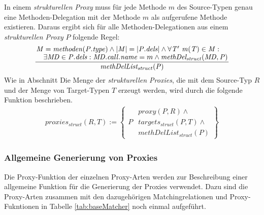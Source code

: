 In einem \emph{strukturellen Proxy} muss für jede Methode $m$ des Source-Typen genau eine Methoden-Delegation mit der Methode $m$ als aufgerufene Methode existieren. Daraus ergibt sich für alle Methoden-Delegationen aus einem \emph{strukturellen Proxy} $P$ folgende Regel:
\begin{gather*}
\frac{\splitfrac{\mathit{M} = \mathit{methoden(P.type)} \wedge |\mathit{M}| = |\mathit{P.dels}| \wedge \forall \mathit{T' \text{ }m(T)} \in \mathit{M}:}{\exists \mathit{MD} \in \mathit{P.dels}:\mathit{MD.call.name} = m \wedge \mathit{methDel_{struct}(MD,P)}
 }
}
{\mathit{methDelList_{struct}(P)}}
\end{gather*}
Wie in Abschnitt 
Die Menge der \emph{strukturellen Proxies}, die mit dem Source-Typ $R$ und der Menge von Target-Typen $T$ erzeugt werden, wird durch die folgende Funktion beschrieben.
\begin{gather*}
\mathit{proxies_{struct}(R,T)} := 
\left\{\begin{array}{l|l}
		& \mathit{proxy(P,R)}\wedge \mathit{ }\\
	P	& \mathit{targets_{struct}(P,T)} \wedge \mathit{ }\\
		& \mathit{methDelList_{struct}(P)}  
		 \end{array}
\right\}
\end{gather*}

\subsubsection{Allgemeine Generierung von Proxies}
Die Proxy-Funktion der einzelnen Proxy-Arten werden zur Beschreibung einer allgemeine Funktion für die Generierung der Proxies verwendet. Dazu sind die Proxy-Arten zusammen mit den dazugehörigen Matchingrelationen und Proxy-Fukntionen in Tabelle \ref{tab:baseMatcher} noch einmal aufgeführt.


